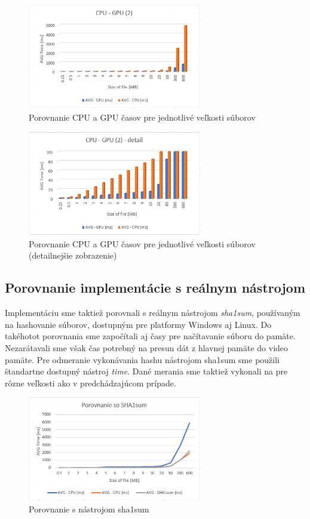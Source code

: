 \documentclass[conference]{IEEEtran}
\begin{document}
\begin{figure}[h!]
\centering
\includegraphics[width=3in]{img/CPU-GPU2}
\caption{Porovnanie CPU a GPU časov pre jednotlivé veľkosti súborov}
\end{figure}

\begin{figure}[h!]
\centering
\includegraphics[width=3in]{img/CPU-GPUdetail2}
\caption{Porovnanie CPU a GPU časov pre jednotlivé veľkosti súborov (detailnejšie zobrazenie)}
\end{figure}

\clearpage

\subsection{Porovnanie implementácie s reálnym nástrojom}

Implementáciu sme taktiež porovnali s reálnym nástrojom \textit{sha1sum}, používaným na hashovanie súborov, dostupným pre platformy Windows aj Linux. Do takéhotot porovnania sme započítali aj časy pre načítavanie súboru do pamäte. Nezarátavali sme však čas potrebný na presun dát z hlavnej pamäte do video pamäte. Pre odmeranie vykonávania hashu nástrojom sha1sum sme použili štandartne dostupný nástroj \textit{time}. Dané merania sme taktiež vykonali na pre rôzne veľkosti ako v predchádzajúcom prípade. 

\begin{figure}[h!]
\centering
\includegraphics[width=3in]{img/sha1sum}
\caption{Porovnanie s nástrojom sha1sum}
\end{figure}
\end{document}
